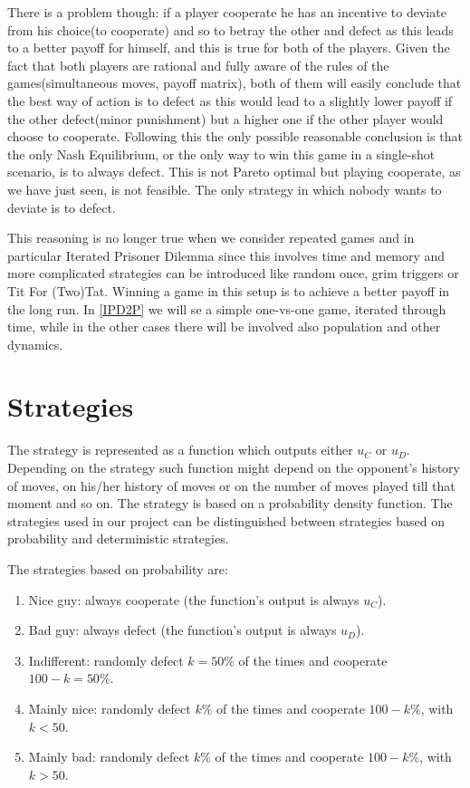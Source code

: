\documentclass[journal,a4paper,10pt,twoside]{IEEEtran}
\begin{document}
There is a problem though: if a player cooperate he has an incentive to deviate from his choice(to cooperate) and so to betray the other and defect as this leads to a better payoff for himself, and this is true for both of the players. Given the fact that both players are rational and fully aware of the rules of the games(simultaneous moves, payoff matrix), both of them will easily conclude that the best way of action is to defect as this would lead to a slightly lower payoff if the other defect(minor punishment) but a higher one if the other player would choose to cooperate. Following this the only possible reasonable conclusion is that the only Nash Equilibrium, or the only way to win this game in a single-shot scenario, is to always defect. This is not Pareto optimal but playing cooperate, as we have just seen, is not feasible. The only strategy in which nobody wants to deviate is to defect.

This reasoning is no longer true when we consider repeated games and in particular Iterated Prisoner Dilemma since this involves time and memory and more complicated strategies can be introduced like random once, grim triggers or Tit For (Two)Tat. Winning a game in this setup is to achieve a better payoff in the long run. In \ref{IPD2P} we will se a simple one-vs-one game, iterated through time, while in the other cases there will be involved also population and other dynamics.

\section{Strategies} \label{Strategies}

The strategy is represented as a function which outputs either $u_C$ or $u_D$. Depending on the strategy such function might depend on the opponent's history of moves, on his/her history of moves or on the number of moves played till that moment and so on. The strategy is based on a probability density function. The strategies used in our project can be distinguished between strategies based on probability and deterministic strategies.

The strategies based on probability are:

\begin{enumerate}
    \item Nice guy: always cooperate (the function's output is always $u_C$).
    \item Bad guy: always defect (the function's output is always $u_D$).
    \item Indifferent: randomly defect $k=50\%$ of the times and cooperate $100-k=50\%$.
    \item Mainly nice: randomly defect $k\%$ of the times and cooperate $100-k\%$, with $k<50$.
    \item Mainly bad: randomly defect $k\%$ of the times and cooperate $100-k\%$, with $k>50$.
\end{enumerate}
\end{document}
